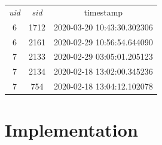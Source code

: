 \documentclass[12pt]{article}
\begin{document}
    \\~\\

    \begin{center}
        \begin{tabular}{ |c|c|c| }
            \hline
            \rowcolor{tablegrey} \multicolumn{3}{|c|}{Play} \\
            \hline
            \emph{uid} & \emph{sid} & timestamp \\
            \hline
            6 & 1712 & 2020-03-20 10:43:30.302306 \\
            \hline
            6 & 2161 & 2020-02-29 10:56:54.644090 \\
            \hline
            7 & 2133 & 2020-02-29 03:05:01.205123 \\
            \hline
            7 & 2134 & 2020-02-18 13:02:00.345236 \\
            \hline
            7 & 754 & 2020-02-18 13:04:12.102078 \\
            \hline
        \end{tabular}
    \end{center}



    \section{Implementation}
\end{document}
